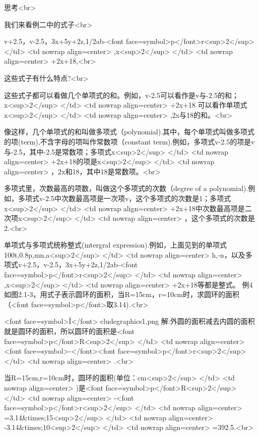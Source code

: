 \endex
思考<br>

我们来看例二中的式子<br>

v+2.5，v-2.5，3x+5y+2z,1/2ab-<font face=symbol>p</font>r<sup>2</sup>
</td>
<td nowrap align=center>
  ,x<sup>2</sup>
</td>
<td nowrap align=center>
  +2x+18,<br>

这些式子有什么特点?<br>

\endarticle

\beginarticle
{}
这些式子都可以看做几个单项式的和。例如，v-2.5可以看作是v与-2.5的和；x<sup>2</sup>
</td>
<td nowrap align=center>
  +2x+18 可以看作单项式x<sup>2</sup>
</td>
<td nowrap align=center>
  ,2x与18的和。<br>

\beginconcept
像这样，几个单项式的和叫做多项式（polynomial).其中，每个单项式叫做多项式的项(term),不含字母的项叫作常数项（constant term).例如，多项式v-2.5的项是v与-2.5，其中-2.5是常数项；多项式x<sup>2</sup>
</td>
<td nowrap align=center>
  +2x+18的项是x<sup>2</sup>
</td>
<td nowrap align=center>
  ，2x和18，其中18是常数项。<br>

多项式里，次数最高的项数，叫做这个多项式的次数（degree of a polynomial).例如，多项式v-2.5中次数最高项是一次项v，这个多项式的次数是1；多项式x<sup>2</sup>
</td>
<td nowrap align=center>
  +2x+18中次数最高项是二次项x<sup>2</sup>
</td>
<td nowrap align=center>
  ，这个多项式的次数是2.<br>

单项式与多项式统称整式(intergral expression).例如，上面见到的单项式100t,0.8p,mn,a<sup>2</sup>
</td>
<td nowrap align=center>
  h,-n，以及多项式v+2.5，v-2.5，3x+5y+2z,1/2ab-<font face=symbol>p</font>r<sup>2</sup>
</td>
<td nowrap align=center>
  ,x<sup>2</sup>
</td>
<td nowrap align=center>
  +2x+18等都是整式。
\endconcept
\beginexample
例4 如图2.1-3，用式子表示圆环的面积，当R=15cm，r=10cm时，求圆环的面积（<font face=symbol>p</font>取3.14).<br>

 <font face=symbol>Î</font> cludegraphics1.png
解:外圆的面积减去内圆的面积就是圆环的面积，所以圆环的面积是<font face=symbol>p</font>R<sup>2</sup>
</td>
<td nowrap align=center>
  <font face=symbol>-</font><font face=symbol>p</font>r<sup>2</sup>
</td>
<td nowrap align=center>
  .<br>

当R=15cm,r=10cm时，圆环的面积(单位：cm<sup>2</sup>
</td>
<td nowrap align=center>
  )是<font face=symbol>p</font>R<sup>2</sup>
</td>
<td nowrap align=center>
  -<font face=symbol>p</font>r<sup>2</sup>
</td>
<td nowrap align=center>
  =3.14&times;15<sup>2</sup>
</td>
<td nowrap align=center>
  -3.14&times;10<sup>2</sup>
</td>
<td nowrap align=center>
  =392.5.<br>


